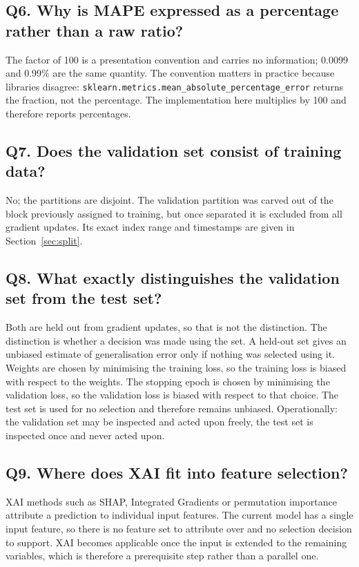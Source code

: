 \documentclass[11pt,a4paper]{article}
\begin{document}
\subsection*{Q6. Why is MAPE expressed as a percentage rather than a raw ratio?}

The factor of 100 is a presentation convention and carries no information; 0.0099 and 0.99\% are
the same quantity. The convention matters in practice because libraries disagree:
\texttt{sklearn.metrics.mean\_absolute\_percentage\_error} returns the fraction, not the
percentage. The implementation here multiplies by 100 and therefore reports percentages.

\subsection*{Q7. Does the validation set consist of training data?}

No; the partitions are disjoint. The validation partition was carved out of the block previously
assigned to training, but once separated it is excluded from all gradient updates. Its exact index
range and timestamps are given in Section~\ref{sec:split}.

\subsection*{Q8. What exactly distinguishes the validation set from the test set?}

Both are held out from gradient updates, so that is not the distinction. The distinction is whether
a decision was made using the set. A held-out set gives an unbiased estimate of generalisation
error only if nothing was selected using it. Weights are chosen by minimising the training loss, so
the training loss is biased with respect to the weights. The stopping epoch is chosen by minimising
the validation loss, so the validation loss is biased with respect to that choice. The test set is
used for no selection and therefore remains unbiased. Operationally: the validation set may be
inspected and acted upon freely, the test set is inspected once and never acted upon.

\subsection*{Q9. Where does XAI fit into feature selection?}

XAI methods such as SHAP, Integrated Gradients or permutation importance attribute a prediction to
individual input features. The current model has a single input feature, so there is no feature set
to attribute over and no selection decision to support. XAI becomes applicable once the input is
extended to the remaining variables, which is therefore a prerequisite step rather than a parallel
one.
\end{document}

